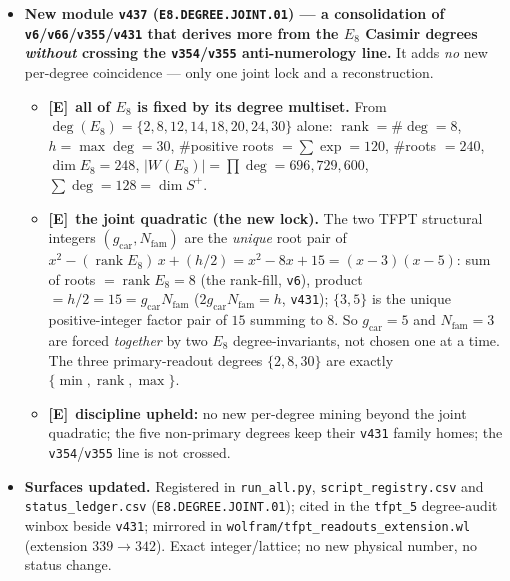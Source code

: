 \documentclass[11pt]{article}
\providecommand{\mE}{\textbf{[E]}}\providecommand{\mC}{\textbf{[C]}}
\providecommand{\vref}[1]{\texttt{#1}}
\providecommand{\gcar}{g_{\mathrm{car}}}\providecommand{\Nfam}{N_{\mathrm{fam}}}
\begin{document}
\begin{itemize}
\item \textbf{New module \texttt{v437} (\texttt{E8.DEGREE.JOINT.01}) --- a consolidation of \vref{v6}/\vref{v66}/\vref{v355}/\vref{v431}
that derives more from the $E_8$ Casimir degrees \emph{without} crossing the \vref{v354}/\vref{v355}
anti-numerology line.} It adds \emph{no} new per-degree coincidence --- only one joint lock and a reconstruction.
\begin{itemize}
\item \mE\ \textbf{all of $E_8$ is fixed by its degree multiset.} From $\deg(E_8)=\{2,8,12,14,18,20,24,30\}$
alone: $\operatorname{rank}=\#\deg=8$, $h=\max\deg=30$, $\#$positive roots $=\sum\exp=120$, $\#$roots $=240$,
$\dim E_8=248$, $|W(E_8)|=\prod\deg=696{,}729{,}600$, $\sum\deg=128=\dim S^+$.
\item \mE\ \textbf{the joint quadratic (the new lock).} The two TFPT structural integers $(\gcar,\Nfam)$ are
the \emph{unique} root pair of $x^2-(\operatorname{rank}E_8)\,x+(h/2)=x^2-8x+15=(x-3)(x-5)$: sum of roots
$=\operatorname{rank}E_8=8$ (the rank-fill, \vref{v6}), product $=h/2=15=\gcar\Nfam$ ($2\gcar\Nfam=h$,
\vref{v431}); $\{3,5\}$ is the unique positive-integer factor pair of $15$ summing to $8$. So $\gcar=5$ and
$\Nfam=3$ are forced \emph{together} by two $E_8$ degree-invariants, not chosen one at a time. The three
primary-readout degrees $\{2,8,30\}$ are exactly $\{\min,\operatorname{rank},\max\}$.
\item \mE\ \textbf{discipline upheld:} no new per-degree mining beyond the joint quadratic; the five
non-primary degrees keep their \vref{v431} family homes; the \vref{v354}/\vref{v355} line is not crossed.
\end{itemize}
\item \textbf{Surfaces updated.} Registered in \texttt{run\_all.py}, \texttt{script\_registry.csv} and
\texttt{status\_ledger.csv} (\texttt{E8.DEGREE.JOINT.01}); cited in the \texttt{tfpt\_5} degree-audit winbox
beside \vref{v431}; mirrored in \texttt{wolfram/tfpt\_readouts\_extension.wl} (extension $339\to342$). Exact
integer/lattice; no new physical number, no status change.
\end{itemize}
\end{document}
